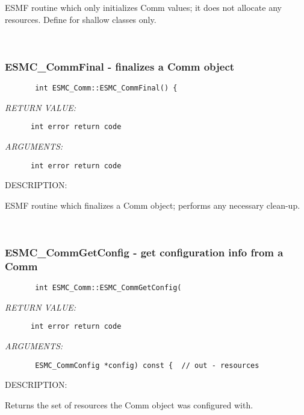         ESMF routine which only initializes Comm values; it does not
        allocate any resources.  Define for shallow classes only.
   
 
\mbox{}\hrulefill\ 
 
\subsubsection{ESMC\_CommFinal - finalizes a Comm object}


  
\begin{verbatim}       int ESMC_Comm::ESMC_CommFinal() {\end{verbatim}{\em RETURN VALUE:}
\begin{verbatim}      int error return code\end{verbatim}{\em ARGUMENTS:}
\begin{verbatim}      int error return code\end{verbatim}
{\sf DESCRIPTION:\\ }


        ESMF routine which finalizes a Comm object; performs any 
        necessary clean-up.
   
 
\mbox{}\hrulefill\ 
 
\subsubsection{ESMC\_CommGetConfig - get configuration info from a Comm}


  
\begin{verbatim}       int ESMC_Comm::ESMC_CommGetConfig(\end{verbatim}{\em RETURN VALUE:}
\begin{verbatim}      int error return code\end{verbatim}{\em ARGUMENTS:}
\begin{verbatim}       ESMC_CommConfig *config) const {  // out - resources\end{verbatim}
{\sf DESCRIPTION:\\ }


      Returns the set of resources the Comm object was configured with.
   
